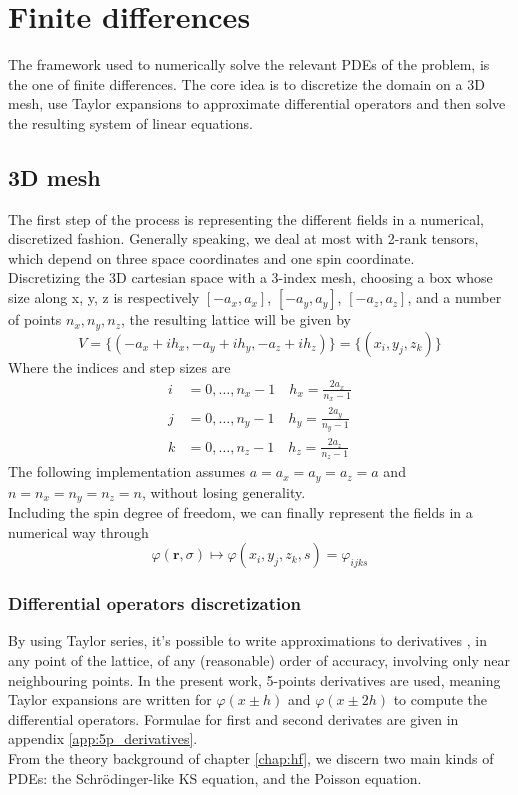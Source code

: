 \section{Finite differences}
\label{sec:finite_diff}
The framework used to numerically solve the relevant PDEs of the problem, is the one of finite differences. The core idea is to discretize the domain on a 3D mesh, use Taylor expansions to approximate differential operators and then solve the resulting system of linear equations.
\subsection{3D mesh}
The first step of the process is representing the different fields in a numerical, discretized fashion.
Generally speaking, we deal at most with 2-rank tensors, which depend on three space coordinates and one spin coordinate.
\\Discretizing the 3D cartesian space with a 3-index mesh, choosing a box whose size along x, y, z is respectively $[-a_x, a_x]$, $[-a_y, a_y]$, $[-a_z, a_z]$, and a number of points $n_x, n_y, n_z$, the resulting lattice will be given by
\begin{equation*}
V=\{(-a_x+ih_x, -a_y+ih_y, -a_z+ih_z)\} = \{(x_i, y_j,z_k)\} 
\end{equation*}
Where the indices and step sizes are
\begin{align*}
  i&=0,\ldots,n_x-1\quad h_x = \frac{2a_x}{n_x-1}\\
  j&=0,\ldots,n_y-1\quad h_y = \frac{2a_y}{n_y-1}\\
  k&=0,\ldots,n_z-1\quad h_z = \frac{2a_z}{n_z-1}
\end{align*}
The following implementation assumes $a=a_x=a_y=a_z=a$ and $n=n_x=n_y=n_z=n$, without losing generality.
\\Including the spin degree of freedom, we can finally represent the fields in a numerical way through
\begin{equation}
    \varphi(\bm r, \sigma) \mapsto \varphi(x_i, y_j, z_k, s) = \varphi_{ijks}
\end{equation}
\subsubsection{Differential operators discretization}
By using Taylor series, it's possible to write approximations to derivatives \cite{Zhou1993}, in any point of the lattice, of any (reasonable) order of accuracy, involving only near neighbouring points. In the present work, 5-points derivatives are used, meaning Taylor expansions are written for $\varphi(x\pm h)$ and $\varphi(x\pm 2h)$ to compute the differential operators. Formulae for first and second derivates are given in appendix \ref{app:5p_derivatives}.
\\From the theory background of chapter \ref{chap:hf}, we discern two main kinds of PDEs: the Schr\"odinger-like KS equation, and the Poisson equation.
